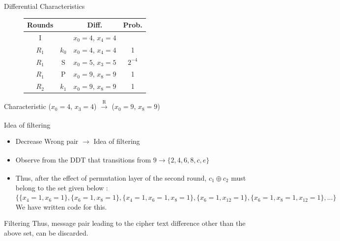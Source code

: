 \begin{frame}{Differential Characteristics}
\begin{figure}[h!]
        \centering
        \begin{tabular}{ |c||c|c|c| }
            \hline
             Rounds & & Diff. & Prob. \\ \hline \hline
             I& & $x_0 = 4$, $x_4 = 4$ &  \\ 
             $R_1$& $k_0$ & $x_0 = 4$, $x_4 = 4$ & 1 \\
             $R_1$& S & $x_0 = 5$, $x_{3} = 5$ & $2^{-4}$ \\
             $R_1$& P & $x_0 = 9$, $x_{8} = 9$ & 1 \\
             $R_2$& $k_1$ & $x_0 = 9$, $x_{8} = 9$ & 1 \\ \hline
        \end{tabular}
        \label{fig7}
    \end{figure}
    \begin{block}{Characteristic}
        ($x_0 = 4$, $x_3 = 4$) $\xrightarrow[]{\text{R}}$ ($x_0 = 9$, $x_8 = 9$)
    \end{block}
\end{frame}

\begin{frame}{Idea of filtering}
    \begin{itemize}
        \item Decrease Wrong pair $\xrightarrow[]{}$ Idea of filtering
        \item Observe from the DDT that transitions from $9 \xrightarrow[]{} \{2,4,6,8,c,e\}$
        \item Thus, after the effect of permutation layer of the second round, $c_1 \oplus c_2$ must belong to the set given below : \\ 
        $\{\{x_4=1,x_6=1\},\{x_6=1,x_8=1\},\{x_4=1,x_6=1,x_8=1\},\{x_6=1,x_{12}=1\},\{x_6=1,x_8=1,x_{12}=1\},...\}$ We have written code for this.
    \end{itemize}
    \begin{block}{Filtering}
        Thus, message pair leading to the cipher text difference other than the above set, can be discarded. 
    \end{block}
\end{frame}

